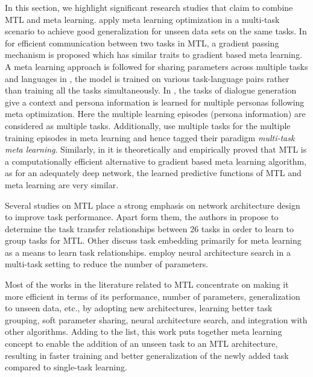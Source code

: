 \documentclass[conference]{IEEEtran}
\begin{document}
In this section, we highlight significant research studies that claim to combine \ac{MTL} and meta learning.
\cite{liuMTL2018, tarunesh2021meta, lee-etal-2021-generating} apply meta learning optimization in a multi-task scenario to achieve good generalization for unseen data sets on the same tasks.
In \cite{liuMTL2018} for efficient communication between two tasks in \ac{MTL}, a gradient passing mechanism is proposed which has similar traits to gradient based meta learning.   
A meta learning approach is followed for sharing parameters across multiple tasks and languages in \cite{tarunesh2021meta}, the model is trained on various task-language pairs rather than training all the tasks simultaneously.
In \cite{lee-etal-2021-generating}, the tasks of dialogue generation give a context and persona information is learned for multiple personas following meta optimization.
Here the multiple learning episodes (persona information) are considered as multiple tasks.
Additionally, \cite{tian2019hierarchical, ghadirzadeh2021bayesian, bronskill2020tasknorm} use multiple tasks for the multiple training episodes in meta learning and hence tagged their paradigm \emph{multi-task meta learning}.
Similarly, in \cite{multi_meta} it is theoretically and empirically  proved that \ac{MTL} is a computationally efficient alternative to gradient based meta learning algorithm, as for an adequately deep network, the learned predictive functions of \ac{MTL} and meta learning are very similar.


Several studies on \ac{MTL} \cite{arch1, misra2016cross, cascade, gao2019nddr, xu2018pad, pram_mtl} place a strong emphasis on network architecture design to improve task performance.
Apart form them, the authors in \cite{zamir2018taskonomy} propose to determine the task transfer relationships between 26 tasks in order to learn to group tasks for \ac{MTL}.
Other \cite{james2018task, lan2019meta, achille2019task2vec, L2MT} discuss task embedding primarily for meta learning as a means to learn task relationships.
\cite{sun2020adashare, guo2020learning} employ neural architecture search in a multi-task setting to reduce the number of parameters. 

Most of the works in the literature related to \ac{MTL} concentrate on making it more efficient in terms of its performance, number of parameters, generalization to unseen data, etc., by adopting new architectures, learning better task grouping, soft parameter sharing, neural architecture search, and integration with other algorithms. 
Adding to the list, this work puts together meta learning concept to enable the addition of an unseen task to an \ac{MTL} architecture, resulting in faster training and better generalization of the newly added task compared to single-task learning.
\end{document}
